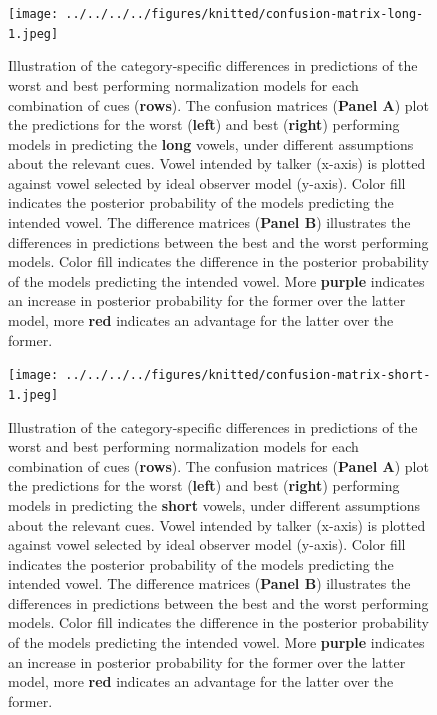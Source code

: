\documentclass[utf8]{frontiers_suppmat} %
\begin{document}
\begin{landscape}

\begin{figure}[H]

{\centering \texttt{[image: ../../../../figures/knitted/confusion-matrix-long-1.jpeg]} 

}

\caption{Illustration of the category-specific differences in predictions of the worst and best performing normalization models for each combination of cues (\textbf{rows}). The confusion matrices (\textbf{Panel A}) plot the predictions for the worst (\textbf{left}) and best (\textbf{right}) performing models in predicting the \textbf{long} vowels, under different assumptions about the relevant cues. Vowel intended by talker (x-axis) is plotted against vowel selected by ideal observer model (y-axis). Color fill indicates the posterior probability of the models predicting the intended vowel. The difference matrices (\textbf{Panel B}) illustrates the differences in predictions between the best and the worst performing models. Color fill indicates the difference in the posterior probability of the models predicting the intended vowel. More \textbf{purple} indicates an increase in posterior probability for the former over the latter model, more \textbf{red} indicates an advantage for the latter over the former.}\label{fig:confusion-matrix-long}
\end{figure}

\begin{figure}[H]

{\centering \texttt{[image: ../../../../figures/knitted/confusion-matrix-short-1.jpeg]} 

}

\caption{Illustration of the category-specific differences in predictions of the worst and best performing normalization models for each combination of cues (\textbf{rows}). The confusion matrices (\textbf{Panel A}) plot the predictions for the worst (\textbf{left}) and best (\textbf{right}) performing models in predicting the \textbf{short} vowels, under different assumptions about the relevant cues. Vowel intended by talker (x-axis) is plotted against vowel selected by ideal observer model (y-axis). Color fill indicates the posterior probability of the models predicting the intended vowel. The difference matrices (\textbf{Panel B}) illustrates the differences in predictions between the best and the worst performing models. Color fill indicates the difference in the posterior probability of the models predicting the intended vowel. More \textbf{purple} indicates an increase in posterior probability for the former over the latter model, more \textbf{red} indicates an advantage for the latter over the former.}\label{fig:confusion-matrix-short}
\end{figure}


\end{landscape}
\end{document}
